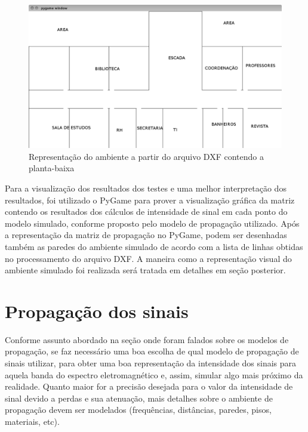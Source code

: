 \documentclass[
	12pt,				%
	twoside,			%
	a4paper,			%
	english,			%
	french,				%
	spanish,			%
	brazil				%
	]{abntex2}
\begin{document}
\begin{figure}[htb]
    \caption{\label{repre_ambiente_dxf_1} Representação do ambiente a partir do arquivo DXF contendo a planta-baixa}
    \begin{center}
        \includegraphics[scale=0.4]{imagens/planta-labels.jpg}
    \end{center}
\end{figure}

Para a visualização dos resultados dos testes e uma melhor interpretação
dos resultados, foi utilizado o PyGame para prover a visualização
gráfica da matriz contendo os resultados dos cálculos de intensidade de
sinal em cada ponto do modelo simulado, conforme proposto pelo modelo de
propagação utilizado. Após a representação da matriz de propagação no
PyGame, podem ser desenhadas também as paredes do ambiente simulado de
acordo com a lista de linhas obtidas no processamento do arquivo DXF. A
maneira como a representação visual do ambiente simulado foi realizada
será tratada em detalhes em seção posterior.

\section{Propagação dos sinais}\label{propagauxe7uxe3o-dos-sinais}

Conforme assunto abordado na seção onde foram falados sobre os modelos
de propagação, se faz necessário uma boa escolha de qual modelo de
propagação de sinais utilizar, para obter uma boa representação da
intensidade dos sinais para aquela banda do espectro eletromagnético e,
assim, simular algo mais próximo da realidade. Quanto maior for a
precisão desejada para o valor da intensidade de sinal devido a perdas e
sua atenuação, mais detalhes sobre o ambiente de propagação devem ser
modelados (frequências, distâncias, paredes, pisos, materiais, etc).
\end{document}
